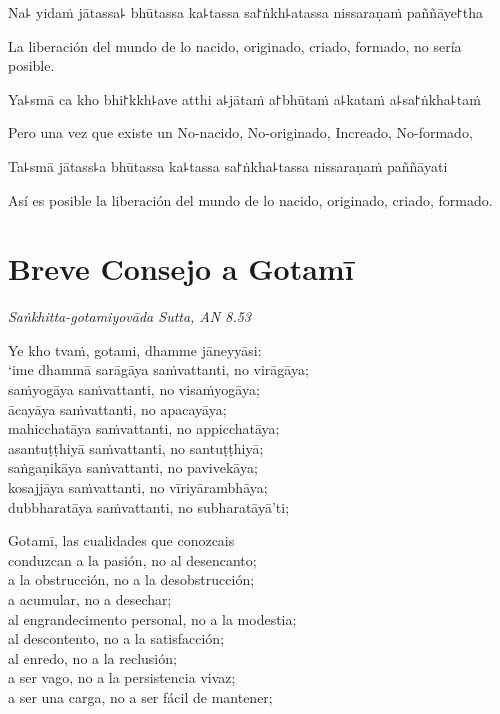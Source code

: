 Na꜕ yidaṁ jātassa꜕ bhūtassa ka꜕tassa sa꜓ṅkh꜕atassa nissaraṇaṁ paññāye꜓tha

\begin{english}
  La liberación del mundo de lo nacido, originado, criado, formado, no sería posible.
\end{english}

Ya꜕smā ca kho bhi꜓kkh꜕ave atthi a꜕jātaṁ a꜓bhūtaṁ a꜕kataṁ a꜕sa꜓ṅkha꜕taṁ

\begin{english}
  Pero una vez que existe un No-nacido, No-originado, Increado, No-formado,
\end{english}

Ta꜕smā jātass꜕a bhūtassa ka꜕tassa sa꜓ṅkha꜕tassa nissaraṇaṁ paññāyati

\begin{english}
  Así es posible la liberación del mundo de lo nacido, originado, criado, formado.
\end{english}

\chapter[Breve Consejo a Gotamī]{Breve Consejo a Gotamī}

\emph{Saṅkhitta-gotamiyovāda Sutta, AN 8.53}


\begin{leader}
\end{leader}

Ye kho tvaṁ, gotami, dhamme jāneyyāsi:\\
‘ime dhammā sarāgāya saṁvattanti, no virāgāya;\\
saṁyogāya saṁvattanti, no visaṁyogāya;\\
ācayāya saṁvattanti, no apacayāya;\\
mahicchatāya saṁvattanti, no appicchatāya;\\
asantuṭṭhiyā saṁvattanti, no santuṭṭhiyā;\\
saṅgaṇikāya saṁvattanti, no pavivekāya;\\
kosajjāya saṁvattanti, no vīriyārambhāya;\\
dubbharatāya saṁvattanti, no subharatāyā’ti;

\begin{english}
  Gotamī, las cualidades que conozcais\\
  conduzcan a la pasión, no al desencanto;\\
  a la obstrucción, no a la desobstrucción;\\
  a acumular, no a desechar;\\
  al engrandecimento personal, no a la modestia;\\
  al descontento, no a la satisfacción;\\
  al enredo, no a la reclusión;\\
  a ser vago, no a la persistencia vivaz;\\
  a ser una carga, no a ser fácil de mantener;
\end{english}

